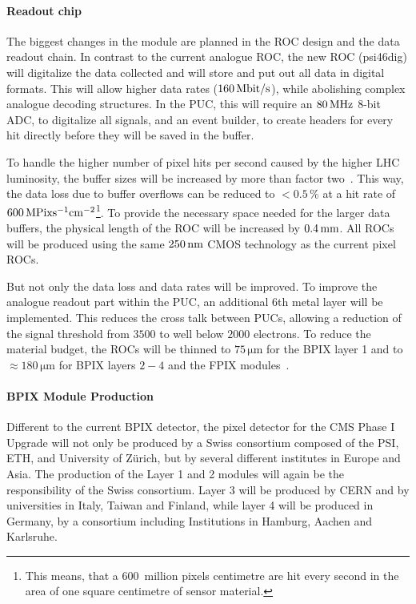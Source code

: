\paragraph*{Readout chip}\label{sec:dig_ROC}
The biggest changes in the module are planned in the \ac{ROC} design and the data readout chain. In contrast to the current analogue \ac{ROC}, the new \ac{ROC} (psi46dig) will digitalize the data collected and will store and put out all data in digital formats. This will allow higher data rates ($160\,\rm{Mbit/s}$), while abolishing complex analogue decoding structures. In the \acs{PUC}, this will require an $80\,\rm{MHz}$ $8$-bit \ac{ADC}, to digitalize all signals, and an event builder, to create headers for every hit directly before they will be saved in the buffer.

To handle the higher number of pixel hits per second caused by the higher \ac{LHC} luminosity, the buffer sizes will be increased by more than factor two~\cite{Dom12}. This way, the data loss due to buffer overflows can be reduced to $<0.5\,\%$ at a hit rate of $600\,\rm{MPix s^{-1}cm^{-2}}$\footnote{This means, that a $600$~million pixels centimetre are hit every second in the area of one square centimetre of sensor material.}. To provide the necessary space needed for the larger data buffers, the physical length of the \ac{ROC} will be increased by $0.4\,\rm{mm}$. All \ac{ROC}s will be produced using the same $250\,\rm{nm}$ \ac{CMOS} technology as the current pixel \ac{ROC}s.

But not only the data loss and data rates will be improved. To improve the analogue readout part within the \acs{PUC}, an additional 6th metal layer will be implemented. This reduces the cross talk between \acs{PUC}s, allowing a reduction of the signal threshold from $3500$ to well below $2000$ electrons. %
To reduce the material budget, the \ac{ROC}s will be thinned to $75\,\si{\micro \meter}$ for the \acs{BPIX} layer 1 and to $\approx 180\,\si{\micro \meter}$ for \acs{BPIX} layers $2-4$ and the \acs{FPIX} modules~\cite{Dom12}.


\paragraph*{\acs{BPIX} Module Production}
Different to the current \acs{BPIX} detector, the pixel detector for the \ac{CMS} Phase I Upgrade will not only be produced by a Swiss consortium composed of the \ac{PSI}, \ac{ETH}, and University of Z\"urich, but by several different institutes in Europe and Asia. The production of the Layer 1 and 2 modules will again be the responsibility of the Swiss consortium. Layer 3 will be produced by CERN and by universities in Italy, Taiwan and Finland, while layer 4 will be produced in Germany, by a consortium including Institutions in Hamburg, Aachen and Karlsruhe.

